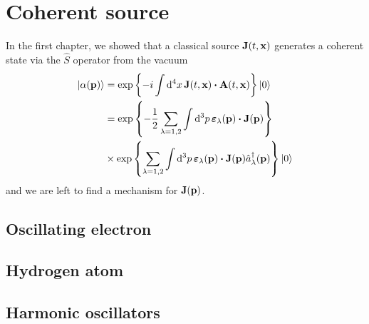 \section{Coherent source}

In the first chapter, we showed that a classical source $\vb{J}(t,\vb{x})$ generates a coherent state via the $\hat{S}$ operator from the vacuum
\begin{equation}
	\begin{split}
		\ket{\alpha(\vb{p})}
		&=
		\exp\left\{
			-i\int\dd[4]{x}
			\vb{J}(t,\vb{x})
			\vdot
			\vb{A}(t,\vb{x})
		\right\}
		\ket{0}
		\\
		&=
		\exp\left\{
			-\frac{1}{2}
			\sum_{\lambda=1,2}
			\int\dd[3]{p}
			\boldsymbol{\varepsilon}_\lambda(\vb{p})
			\vdot
			\vb{J}(\vb{p})
		\right\}
		\\
		&\times
		\exp\left\{
			\sum_{\lambda=1,2}
			\int\dd[3]{p}
			\boldsymbol{\varepsilon}_\lambda(\vb{p})
			\vdot
			\vb{J}(\vb{p})
			\hat{a}_\lambda^\dagger(\vb{p})
		\right\}
		\ket{0}
	\end{split}
\end{equation}
and we are left to find a mechanism for $\vb{J}(\vb{p})$.

\subsection{Oscillating electron}

\subsection{Hydrogen atom}

\subsection{Harmonic oscillators}